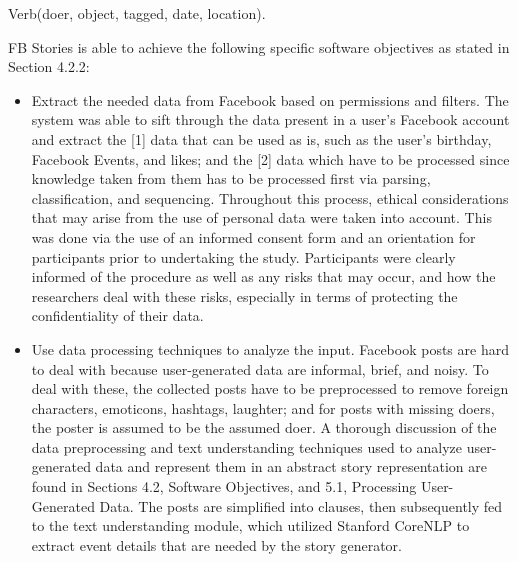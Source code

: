 \begin{center} Verb(doer, object, tagged, date, location). \end{center}

FB Stories is able to achieve the following specific software objectives as stated in Section 4.2.2:
\begin{itemize}
	\item Extract the needed data from Facebook based on permissions and filters. \newline\newline
	The system was able to sift through the data present in a user's Facebook account and extract the [1] data that can be used as is, such as the user's birthday, Facebook Events, and likes; and the [2] data which have to be processed since knowledge taken from them has to be processed first via parsing, classification, and sequencing. \newline\newline
	Throughout this process, ethical considerations that may arise from the use of personal data were taken into account. This was done via the use of an informed consent form and an orientation for participants prior to undertaking the study. Participants were clearly informed of the procedure as well as any risks that may occur, and how the researchers deal with these risks, especially in terms of protecting the confidentiality of their data. \newline\newline
	
	\item Use data processing techniques to analyze the input. \newline\newline
	Facebook posts are hard to deal with because user-generated data are informal, brief, and noisy. To deal with these, the collected posts have to be preprocessed to remove foreign characters, emoticons, hashtags, laughter; and for posts with missing doers, the poster is assumed to be the assumed doer. A thorough discussion of the data preprocessing and text understanding techniques used to analyze user-generated data and represent them in an abstract story representation are found in Sections 4.2, Software Objectives, and 5.1, Processing User-Generated Data. The posts are simplified into clauses, then subsequently fed to the text understanding module, which utilized Stanford CoreNLP to extract event details that are needed by the story generator. \newline\newline
	

\end{itemize}
